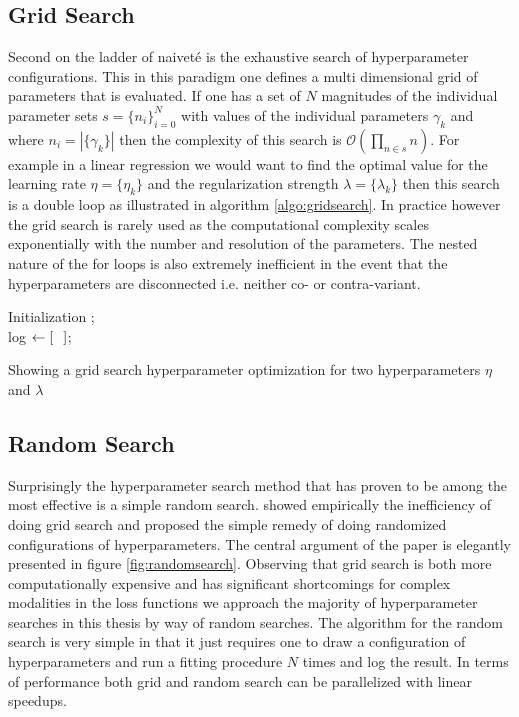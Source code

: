 \subsection{Grid Search}
Second on the ladder of naiveté is the exhaustive search of hyperparameter configurations. This in this paradigm one defines a multi dimensional grid of parameters that is evaluated. If one has a set of $N$ magnitudes of the individual parameter sets $s = \{n_i\}_{i=0}^{N}$ with values of the individual parameters $\gamma_k$ and where $n_i = |\{\gamma_k\}|$ then the complexity of this search is $\mathcal{O}(\prod_{n \in s} n)$. For example in a linear regression we would want to find the optimal value for the learning rate $\eta = \{\eta_k\}$ and the regularization strength $\lambda = \{\lambda_k\}$ then this search is a double loop as illustrated in algorithm \ref{algo:gridsearch}. In practice however the grid search is rarely used as the computational complexity scales exponentially with the number and resolution of the parameters. The nested nature of the for loops is also extremely inefficient in the event that the hyperparameters are disconnected i.e. neither co- or contra-variant.  

\begin{algorithm}[H]
\SetAlgoLined
{}
Initialization ;\\
log $\leftarrow [\hspace{0.1in}]$;\\
\caption{Showing a grid search hyperparameter optimization for two hyperparameters $\eta$ and $\lambda$}\label{algo:gridsearch}
\end{algorithm}

\subsection{Random Search}
Surprisingly the hyperparameter search method that has proven to be among the most effective is a simple random search. \citet{Bergstra2012} showed empirically the inefficiency of doing grid search and proposed the simple remedy of doing randomized configurations of hyperparameters. The central argument of the paper is elegantly presented in figure \ref{fig:randomsearch}. Observing that grid search is both more computationally expensive and has significant shortcomings for complex modalities in the loss functions we approach the majority of hyperparameter searches in this thesis by way of random searches. The algorithm for the random search is  very simple in that it just requires one to draw a configuration of hyperparameters and run a fitting procedure $N$ times and log the result. In terms of performance both grid and random search can be parallelized with linear speedups. 

